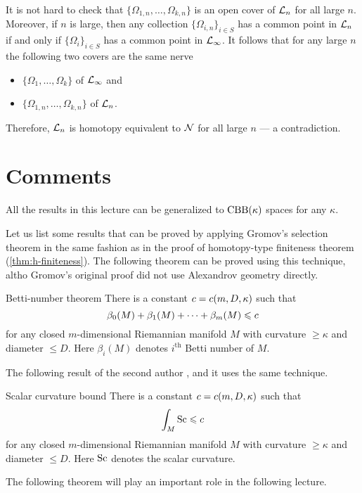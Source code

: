 It is not hard to check that $\{\Omega_{1,n},\dots,\Omega_{k,n}\}$ is an open cover of $\mathcal{L}_n$ for all large $n$.
Moreover, if $n$ is large, then any collection $\{\Omega_{i,n}\}_{i\in S}$ has a common point in $\mathcal{L}_n$ 
if and only if $\{\Omega_{i}\}_{i\in S}$ has a common point in $\mathcal{L}_\infty$.
It follows that for any large $n$ the following two covers are the same nerve
\begin{itemize}
\item $\{\Omega_{1},\dots,\Omega_{k}\}$ of $\mathcal{L}_\infty$ and 
\item $\{\Omega_{1,n},\dots,\Omega_{k,n}\}$ of $\mathcal{L}_n$.
\end{itemize}
Therefore, $\mathcal{L}_n$ is homotopy equivalent to $\mathcal{N}$ for all large $n$ --- a contradiction.
\qeds


\section{Comments}

All the results in this lecture can be generalized to $\mathrm{CBB}(\kappa)$ spaces for any $\kappa$.

Let us list some results that can be proved by applying Gromov's selection theorem
in the same fashion as in the proof of homotopy-type finiteness theorem (\ref{thm:h-finiteness}).
The following theorem can be proved using this technique, altho Gromov's original proof \cite{gromov-1981} did not use Alexandrov geometry directly.

\begin{thm}{Betti-number theorem}
There is a constant $c=c(m,D,\kappa)$ such that 
\[\beta_0(M)+\beta_1(M)+\dots+\beta_m(M)\leqslant c\]
for any closed $m$-dimensional Riemannian manifold $M$ with curvature $\ge \kappa$ and diameter $\le D$.
Here $\beta_i(M)$ denotes $i^\text{th}$ Betti number of $M$.
\end{thm}

The following result of the second author \cite{petrunin2008}, and it uses the same technique.

\begin{thm}{Scalar curvature bound}
There is a constant $c=c(m,D,\kappa)$ such that 
\[\int_M\mathrm{Sc}\leqslant c\]
for any closed $m$-dimensional Riemannian manifold $M$ with curvature $\ge \kappa$ and diameter $\le D$.
Here $\mathrm{Sc}$ denotes the scalar curvature.
\end{thm}

The following theorem will play an important role in the following lecture.

